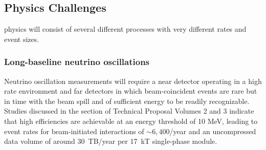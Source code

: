 \subsection{Physics Challenges}


  physics will consist of several different processes with very different rates and event sizes. 


\subsubsection{Long-baseline neutrino oscillations} Neutrino oscillation measurements will require a near detector operating in a high rate environment and far detectors in which beam-coincident events are rare but in time with the beam spill and of sufficient energy to be readily recognizable.  Studies discussed in the  section of  Technical Proposal Volumes 2 and 3 indicate that high efficiencies are achievable at an energy threshold of 10 MeV, leading to event rates for beam-initiated  interactions of $\sim 6,400$/year and an uncompressed data volume of around 30~TB/year per 17~kT single-phase module. 



